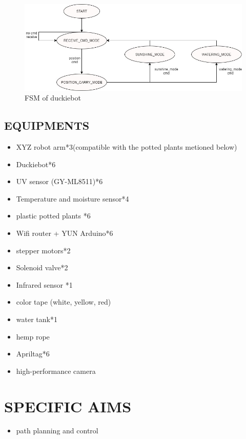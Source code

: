 \documentclass[a4paper, 10pt, conference]{ieeeconf}      %
\begin{document}
\begin{figure}[htbp] %
\includegraphics[width=0.8\columnwidth]{car_fsm.jpg}
\centering
\caption{FSM of duckiebot}
\end{figure}





\subsection{EQUIPMENTS} 

\begin{itemize}
\item XYZ robot arm*3(compatible with the potted plants metioned below)
\item Duckiebot*6
\item UV sensor (GY-ML8511)*6
\item Temperature and moisture sensor*4
\item plastic potted plants *6
\item Wifi router + YUN Arduino*6
\item stepper motors*2
\item Solenoid valve*2
\item Infrared sensor *1
\item color tape (white, yellow, red)
\item water tank*1
\item hemp rope
\item Apriltag*6
\item high-performance camera
\end{itemize}






\section{SPECIFIC AIMS}



\begin{itemize}
\item path planning and control
\end{itemize}
\end{document}
